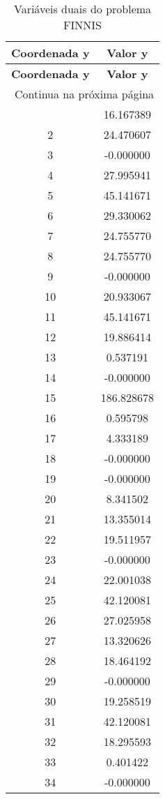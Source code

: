 \documentclass[12pt]{article}
\begin{document}
\begin{longtable}{@{}cc@{}}
\caption{Variáveis duais do problema FINNIS} \\
\toprule
\textbf{Coordenada y} & \textbf{Valor y} \\
\midrule
\endfirsthead

\toprule
\textbf{Coordenada y} & \textbf{Valor y} \\
\midrule
\endhead

\midrule \multicolumn{2}{r}{{Continua na próxima página}} \\ \midrule
\endfoot

\bottomrule
\endlastfoot
1 & 16.167389 \\
2 & 24.470607 \\
3 & -0.000000 \\
4 & 27.995941 \\
5 & 45.141671 \\
6 & 29.330062 \\
7 & 24.755770 \\
8 & 24.755770 \\
9 & -0.000000 \\
10 & 20.933067 \\
11 & 45.141671 \\
12 & 19.886414 \\
13 & 0.537191 \\
14 & -0.000000 \\
15 & 186.828678 \\
16 & 0.595798 \\
17 & 4.333189 \\
18 & -0.000000 \\
19 & -0.000000 \\
20 & 8.341502 \\
21 & 13.355014 \\
22 & 19.511957 \\
23 & -0.000000 \\
24 & 22.001038 \\
25 & 42.120081 \\
26 & 27.025958 \\
27 & 13.320626 \\
28 & 18.464192 \\
29 & -0.000000 \\
30 & 19.258519 \\
31 & 42.120081 \\
32 & 18.295593 \\
33 & 0.401422 \\
34 & -0.000000 \\

\end{longtable}
\end{document}

